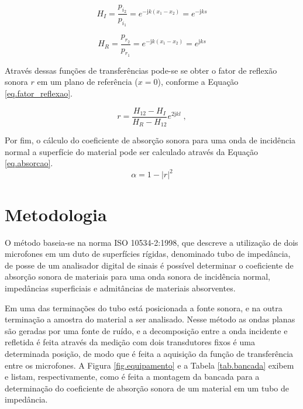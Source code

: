 \begin{equation}
H_{I} = \frac{p_{i_{2}}}{p_{i_{1}}}=e^{-\text{j}k(x_{1}-x_{2})}=e^{-\text{j}ks}
\label{eq.funcao_transferencia_i}
\end{equation} 

\begin{equation}
H_{R} = \frac{p_{r_{2}}}{p_{r_{1}}}=e^{-\text{j}k(x_{1}-x_{2})}=e^{\text{j}ks}
\label{eq.funcao_transferencia_r}
\end{equation}


Através dessas funções de transferências pode-se se obter o fator de reflexão sonora $r$ em um plano de referência ($x=0$), conforme a Equação \ref{eq.fator_reflexao}.

\begin{equation}
r=\frac{H_{12}-H_{I}}{H_{R}-H_{12}}e^{2\text{j}kl}\;,
\label{eq.fator_reflexao}
\end{equation}

Por fim, o cálculo do coeficiente de absorção sonora para uma onda de incidência normal a superfície do material pode ser calculado através da Equação \ref{eq.absorcao}.
\begin{equation}
\boxed{\alpha=1-|r|^{2}}
\label{eq.absorcao}
\end{equation} 

\chapter{Metodologia}

O método baseia-se na norma ISO 10534-2:1998, que descreve a utilização de dois microfones em um duto de superfícies rígidas, denominado tubo de impedância, de posse de um analisador digital de sinais é possível determinar o coeficiente de absorção sonora de materiais para uma onda sonora de incidência normal, impedâncias superficiais e admitâncias de materiais absorventes.  

Em uma das terminações do tubo está posicionada a fonte sonora, e na outra terminação a amostra do material a ser analisado. Nesse método as ondas planas são geradas por uma fonte de ruído, e a decomposição entre a onda incidente e refletida é feita através da medição com dois transdutores fixos é uma determinada posição, de modo que é feita a aquisição da função de transferência entre os microfones. A Figura \ref{fig.equipamento} e a Tabela \ref{tab.bancada} exibem e listam, respectivamente, como é feita a montagem da bancada para a determinação do coeficiente de absorção sonora de um material em um tubo de impedância.

